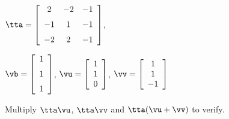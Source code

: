 {$\tta = \left[ \begin {array}{ccc} 2&-2&-1 \\ \noalign{\medskip} -1&1&-1\\ \noalign{\medskip} -2&2&-1 \end {array} \right] $, 

$\vb=\left[ \begin {array}{c} 1\\ \noalign{\medskip}1 \\ \noalign{\medskip} 1 \end {array} \right] $, 
$\vu = \left[ \begin {array}{c} 1 \\ 1 \\ 0  \end{array} \right]$, 
$\vv = \left[ \begin{array}{c} 1\\ 1 \\ -1  \end{array} \right] $}
{Multiply $\tta\vu$, $\tta\vv$ and $\tta(\vu+\vv)$ to verify.}
